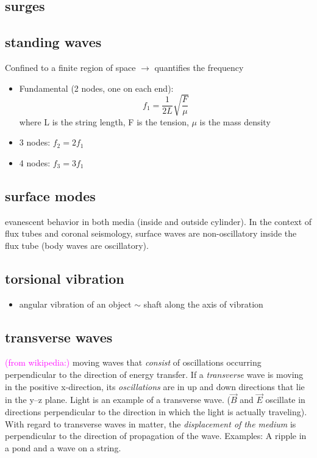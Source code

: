 \documentclass{article}
\begin{document}
\subsection{surges}

\subsection{standing waves}
Confined to a finite region of space $\rightarrow$ quantifies the frequency
\begin{itemize}
    \item Fundamental (2 nodes, one on each end):
        $$f_1 = \frac{1}{2L}\sqrt{\frac{F}{\mu}}$$
        where L is the string length, F is the tension, $\mu$ is the mass density
    \item 3 nodes: $f_2 = 2f_1$
    \item 4 nodes: $f_3 = 3f_1$
\end{itemize}


\subsection{surface modes}
evanescent behavior in both media (inside and outside cylinder).
In the context of flux tubes and coronal seismology, surface waves are
non-oscillatory inside the flux tube (body waves are oscillatory).

\subsection{torsional vibration}
\begin{itemize}
    \item angular vibration of an object $\sim$ shaft along the
        axis of vibration
\end{itemize}

\subsection{transverse waves}
\textcolor{magenta}{(from wikipedia:)}
moving waves that \emph{consist} of oscillations occurring perpendicular
to the direction of energy transfer.
If a \emph{transverse} wave is moving in the positive x-direction,
its \emph{oscillations} are in up and down directions that lie in the y–z plane.
Light is an example of a transverse wave.
($\vec{B}$ and $\vec{E}$ oscillate in directions perpendicular to the direction
in which the light is actually traveling).
With regard to transverse waves in matter,
the \emph{displacement of the medium} is perpendicular to the
direction of propagation of the wave.
Examples: A ripple in a pond and a wave on a string.
\end{document}
